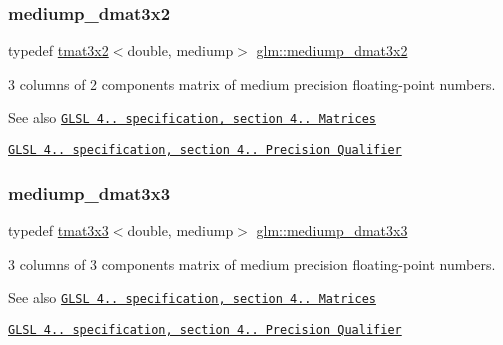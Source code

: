 \subsubsection{\texorpdfstring{mediump\+\_\+dmat3x2}{mediump\_dmat3x2}}
{\footnotesize\ttfamily typedef \hyperlink{structglm_1_1tmat3x2}{tmat3x2}$<$double, mediump$>$ \hyperlink{group__core__precision_ga5ad217fad4f08abe72401409595076f2}{glm\+::mediump\+\_\+dmat3x2}}

3 columns of 2 components matrix of medium precision floating-\/point numbers.

\begin{DoxySeeAlso}{See also}
\href{http://www.opengl.org/registry/doc/GLSLangSpec.4.20.8.pdf}{\tt G\+L\+SL 4.. specification, section 4.. Matrices} 

\href{http://www.opengl.org/registry/doc/GLSLangSpec.4.20.8.pdf}{\tt G\+L\+SL 4.. specification, section 4.. Precision Qualifier} 
\end{DoxySeeAlso}
\mbox{\label{group__core__precision_ga7c4e98b7bf5674658ba5e0892e9bf531}} 
\subsubsection{\texorpdfstring{mediump\+\_\+dmat3x3}{mediump\_dmat3x3}}
{\footnotesize\ttfamily typedef \hyperlink{structglm_1_1tmat3x3}{tmat3x3}$<$double, mediump$>$ \hyperlink{group__core__precision_ga7c4e98b7bf5674658ba5e0892e9bf531}{glm\+::mediump\+\_\+dmat3x3}}

3 columns of 3 components matrix of medium precision floating-\/point numbers.

\begin{DoxySeeAlso}{See also}
\href{http://www.opengl.org/registry/doc/GLSLangSpec.4.20.8.pdf}{\tt G\+L\+SL 4.. specification, section 4.. Matrices} 

\href{http://www.opengl.org/registry/doc/GLSLangSpec.4.20.8.pdf}{\tt G\+L\+SL 4.. specification, section 4.. Precision Qualifier} 
\end{DoxySeeAlso}
\mbox{\label{group__core__precision_ga38bf4080b5b7d9ecc1fdbe2932511e4b}} 
